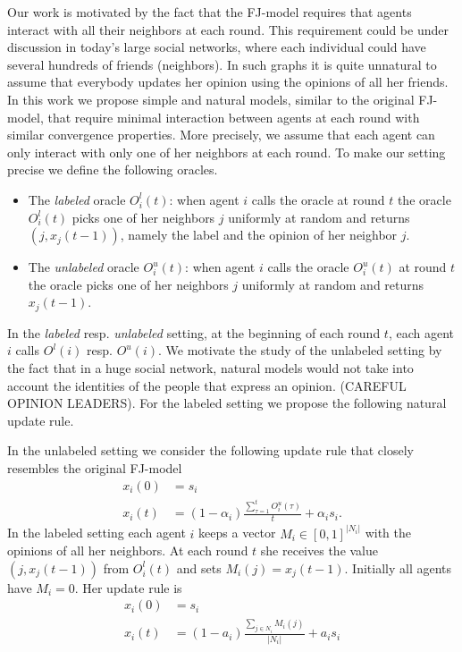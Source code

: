 Our work is motivated by the fact that the FJ-model requires that
agents interact with all their neighbors at each round. This requirement
could be under discussion in today's large social networks, where each individual
could have several hundreds of friends (neighbors). In such graphs it is quite
unnatural to assume that everybody updates her opinion using the opinions of all
her friends. In this work we propose simple and natural models, similar to
the original FJ-model, that require minimal interaction between agents at each
round with similar convergence properties. More precisely, we assume that
each agent can only interact with only one of her neighbors at each round.
To make our setting precise we define the following oracles.
\begin{itemize}
  \item The \emph{labeled} oracle $O^l_i(t)$: when
    agent $i$ calls the oracle at round $t$ the oracle $O^l_i(t)$ picks one
    of her neighbors $j$ uniformly at random and returns $(j, x_j(t-1))$,
    namely the label and the opinion of her neighbor $j$.

  \item The \emph{unlabeled} oracle $O^u_i(t)$: when
    agent $i$ calls the oracle $O^u_i(t)$ at round $t$ the oracle picks one
    of her neighbors $j$ uniformly at random and returns $x_j(t-1)$.
\end{itemize}
In the \emph{labeled} resp. \emph{unlabeled} setting, at the beginning of each
round $t$, each agent $i$ calls $O^l(i)$ resp. $O^u(i)$.
We motivate the study of the unlabeled setting by the fact that
in a huge social network, natural models would not take into account
the identities of the people that express an opinion. (CAREFUL OPINION LEADERS).
For the labeled setting we propose the following natural update rule.

In the unlabeled setting we consider the following update rule that closely
resembles the original FJ-model
\begin{align}
  x_i(0) &= s_i \nonumber \\
  x_i(t) &=
  (1-\alpha_i)\frac{\sum_{\tau=1}^{t} O^u_i(\tau)}{t} + \alpha_i s_i.
  \label{eq:unlabeled_update_rule}
\end{align}
In the labeled setting each agent $i$ keeps a vector $M_i \in [0,1]^{|N_i|}$
with the opinions of all her neighbors. At each round $t$ she receives the
value $(j, x_j(t-1))$ from $O_i^l(t)$ and sets $M_i(j) = x_j(t-1)$. Initially
all agents have $M_i = 0$. Her update rule is
\begin{align}
  x_i(0) &= s_i \nonumber \\
  x_i(t) &=  (1-a_i) \frac{\sum_{j\in N_i} M_i(j)}{|N_i|} + a_i s_i
  \label{eq:labeled_update_rule}
\end{align}

